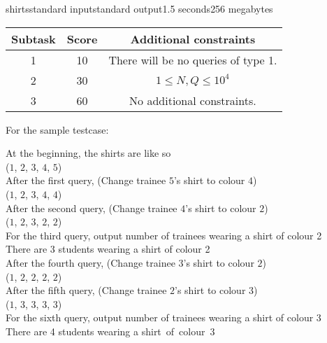 \begin{problem}{shirts}{standard input}{standard output}{1.5 seconds}{256 megabytes}
\begin{center}
\begin{tabular}{|c|c|c|} 
\hline
\textbf{Subtask} & \textbf{Score} & \textbf{Additional constraints} \\
\hline
1 & 10 & There will be no queries of type 1. \\
\hline
2 & 30 & $1 \leq N, Q \leq 10^4$ \\ 
\hline
3 & 60 & No additional constraints. \\
\hline
\end{tabular}
\end{center}

\Example

\begin{example}
%
\end{example}

\Note
For the sample testcase:

At the beginning, the shirts are like so\\
($1$, $2$, $3$, $4$, $5$)\\
After the first query, (Change trainee $5$'s shirt to colour $4$)\\
($1$, $2$, $3$, $4$, $4$)\\
After the second query, (Change trainee $4$'s shirt to colour $2$)\\
($1$, $2$, $3$, $2$, $2$)\\
For the third query, output number of trainees wearing a shirt of colour 2\\
There are 3 students wearing a shirt of colour 2\\
After the fourth query, (Change trainee $3$'s shirt to colour $2$)\\
($1$, $2$, $2$, $2$, $2$)\\
After the fifth query, (Change trainee $2$'s shirt to colour $3$)\\
($1$, $3$, $3$, $3$, $3$)\\
For the sixth query, output number of trainees wearing a shirt of colour 3\\
There are 4 students wearing a shirt of colour 3\\

\end{problem}

